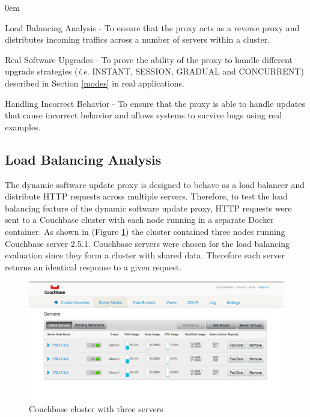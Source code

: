 \documentclass[a4paper,11pt,twoside]{report}
\begin{document}
\begin{list}{-}{}
  \itemsep0em
  \item{Load Balancing Analysis} - To ensure that the proxy acts as a reverse proxy and distributes incoming traffics across a number of servers within a cluster. 

  \item{Real Software Upgrades} - To prove the ability of the proxy to handle different upgrade strategies (\textit{i.e.} INSTANT, SESSION, GRADUAL and CONCURRENT) described in Section \ref{modes} in real applications. 
  
   \item{Handling Incorrect Behavior} - To ensure that the proxy is able to handle updates that cause incorrect behavior and allows systems to survive bugs using real examples. 
\end{list} 

\subsection{Load Balancing Analysis}
The dynamic software update proxy is designed to behave as a load balancer and distribute  HTTP requests across multiple servers. Therefore, to test the load balancing feature of the dynamic software update proxy, HTTP requests were sent to a Couchbase cluster with each node running in a separate Docker container. As shown in (Figure \ref{couchbase_cluster}) the cluster contained three nodes running Couchbase server 2.5.1.  Couchbase servers were chosen for the load balancing evaluation since they form a cluster with shared data. Therefore each server returns an identical response to a given request.

\begin{figure}[!ht]
  \centering
     \includegraphics[scale=0.40]{couchbase_cluster}
  \caption{Couchbase cluster with three servers}
  \label{couchbase_cluster}
\end{figure} 
\end{document}
